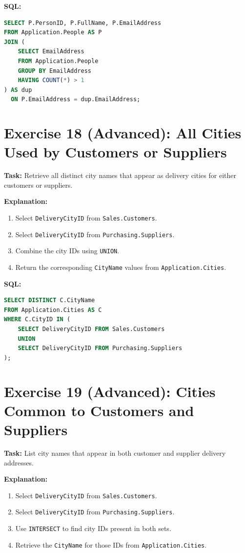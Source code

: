 \documentclass[12pt,a4paper]{article}
\begin{document}
\textbf{SQL:}
\begin{lstlisting}[language=SQL]
SELECT P.PersonID, P.FullName, P.EmailAddress
FROM Application.People AS P
JOIN (
    SELECT EmailAddress
    FROM Application.People
    GROUP BY EmailAddress
    HAVING COUNT(*) > 1
) AS dup
  ON P.EmailAddress = dup.EmailAddress;
\end{lstlisting}

\section{Exercise 18 (Advanced): All Cities Used by Customers or Suppliers}
\textbf{Task:} Retrieve all distinct city names that appear as delivery cities for either customers or suppliers.

\textbf{Explanation:}
\begin{enumerate}
  \item Select \texttt{DeliveryCityID} from \texttt{Sales.Customers}.
  \item Select \texttt{DeliveryCityID} from \texttt{Purchasing.Suppliers}.
  \item Combine the city IDs using \texttt{UNION}.
  \item Return the corresponding \texttt{CityName} values from \texttt{Application.Cities}.
\end{enumerate}

\textbf{SQL:}
\begin{lstlisting}[language=SQL]
SELECT DISTINCT C.CityName
FROM Application.Cities AS C
WHERE C.CityID IN (
    SELECT DeliveryCityID FROM Sales.Customers
    UNION
    SELECT DeliveryCityID FROM Purchasing.Suppliers
);
\end{lstlisting}

\section{Exercise 19 (Advanced): Cities Common to Customers and Suppliers}
\textbf{Task:} List city names that appear in both customer and supplier delivery addresses.

\textbf{Explanation:}
\begin{enumerate}
  \item Select \texttt{DeliveryCityID} from \texttt{Sales.Customers}.
  \item Select \texttt{DeliveryCityID} from \texttt{Purchasing.Suppliers}.
  \item Use \texttt{INTERSECT} to find city IDs present in both sets.
  \item Retrieve the \texttt{CityName} for those IDs from \texttt{Application.Cities}.
\end{enumerate}
\end{document}
